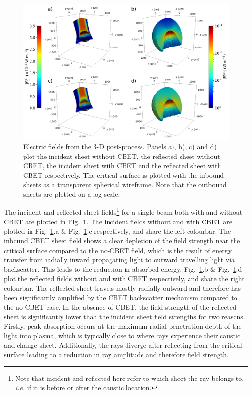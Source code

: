 \begin{figure}[t!]
    \includegraphics[width=1.0\linewidth]{Numerics/Images/IFRIIT_test_fields.png}
    \centering
    \caption{Electric fields from the 3-D post-process.
    Panels a), b), c) and d) plot the incident sheet without \ac{CBET}, the reflected sheet without \ac{CBET}, the incident sheet with \ac{CBET} and the reflected sheet with \ac{CBET} respectively.
    The critical surface is plotted with the inbound sheets as a transparent spherical wireframe.
    Note that the outbound sheets are plotted on a log scale.}%
    \label{fig:SOLAS_IFRIIT_test_fields}
\end{figure}

The incident and reflected sheet fields\footnote{Note that incident and reflected here refer to which sheet the ray belongs to, \textit{i.e.} if it is before or after the caustic location.} for a single beam both with and without \ac{CBET} are plotted in Fig.~\ref{fig:SOLAS_IFRIIT_test_fields}.
The incident fields without and with \ac{CBET} are plotted in Fig.~\ref{fig:SOLAS_IFRIIT_test_fields}.a \& Fig.~\ref{fig:SOLAS_IFRIIT_test_fields}.c respectively, and share the left colourbar.
The inbound \ac{CBET} sheet field shows a clear depletion of the field strength near the critical surface compared to the no-\ac{CBET} field, which is the result of energy transfer from radially inward propagating light to outward travelling light via backscatter.
This leads to the reduction in absorbed energy.
Fig.~\ref{fig:SOLAS_IFRIIT_test_fields}.b \& Fig.~\ref{fig:SOLAS_IFRIIT_test_fields}.d plot the reflected fields without and with \ac{CBET} respectively, and share the right colourbar.
The reflected sheet travels mostly radially outward and therefore has been significantly amplified by the \ac{CBET} backscatter mechanism compared to the no-\ac{CBET} case.
In the absence of \ac{CBET}, the field strength of the reflected sheet is significantly lower than the incident sheet field strengths for two reasons.
Firstly, peak absorption occurs at the maximum radial penetration depth of the light into plasma, which is typically close to where rays experience their caustic and change sheet.
Additionally, the rays diverge after reflecting from the critical surface leading to a reduction in ray amplitude and therefore field strength.


